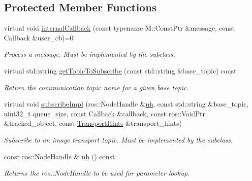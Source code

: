 \subsection*{Protected Member Functions}
\begin{DoxyCompactItemize}
\item 
virtual void \hyperlink{classimage__transport_1_1_simple_subscriber_plugin_ae3fbeb43694289e50670d7050da82a1a}{internal\-Callback} (const typename M\-::\-Const\-Ptr \&message, const Callback \&user\-\_\-cb)=0
\begin{DoxyCompactList}\small\item\em Process a message. Must be implemented by the subclass. \end{DoxyCompactList}\item 
virtual std\-::string \hyperlink{classimage__transport_1_1_simple_subscriber_plugin_a02016ab17568754d5319ae6fd949e268}{get\-Topic\-To\-Subscribe} (const std\-::string \&base\-\_\-topic) const 
\begin{DoxyCompactList}\small\item\em Return the communication topic name for a given base topic. \end{DoxyCompactList}\item 
\hypertarget{classimage__transport_1_1_simple_subscriber_plugin_adead418bf0be6f6511af9e6a03ab8322}{virtual void \hyperlink{classimage__transport_1_1_simple_subscriber_plugin_adead418bf0be6f6511af9e6a03ab8322}{subscribe\-Impl} (ros\-::\-Node\-Handle \&\hyperlink{classimage__transport_1_1_simple_subscriber_plugin_a700540fba60461092751c14d4ff27681}{nh}, const std\-::string \&base\-\_\-topic, uint32\-\_\-t queue\-\_\-size, const Callback \&callback, const ros\-::\-Void\-Ptr \&tracked\-\_\-object, const \hyperlink{classimage__transport_1_1_transport_hints}{Transport\-Hints} \&transport\-\_\-hints)}\label{classimage__transport_1_1_simple_subscriber_plugin_adead418bf0be6f6511af9e6a03ab8322}

\begin{DoxyCompactList}\small\item\em Subscribe to an image transport topic. Must be implemented by the subclass. \end{DoxyCompactList}\item 
\hypertarget{classimage__transport_1_1_simple_subscriber_plugin_a700540fba60461092751c14d4ff27681}{const ros\-::\-Node\-Handle \& \hyperlink{classimage__transport_1_1_simple_subscriber_plugin_a700540fba60461092751c14d4ff27681}{nh} () const }\label{classimage__transport_1_1_simple_subscriber_plugin_a700540fba60461092751c14d4ff27681}

\begin{DoxyCompactList}\small\item\em Returns the ros\-::\-Node\-Handle to be used for parameter lookup. \end{DoxyCompactList}\end{DoxyCompactItemize}
